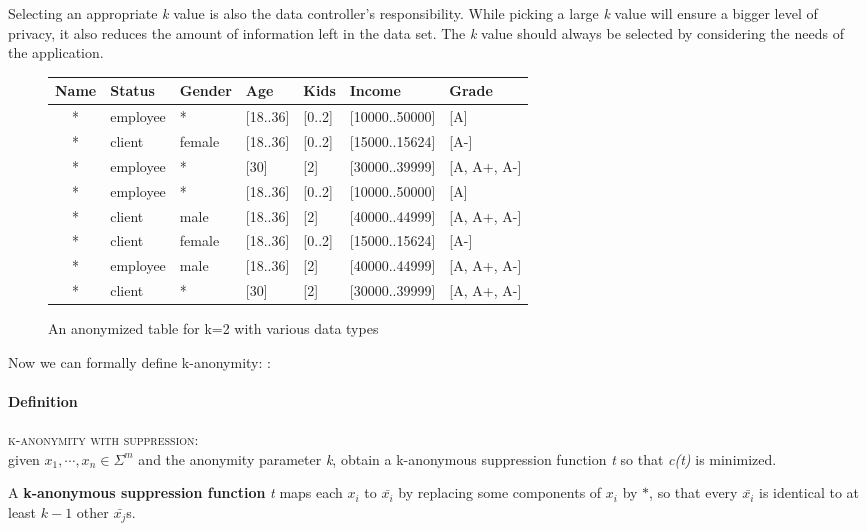 Selecting an appropriate \textit{k} value is also the data controller's responsibility. While picking a large \textit{k} value will ensure a bigger level of privacy, it also reduces the amount of information left in the data set. The \textit{k} value should always be selected by considering the needs of the application.

\begin{figure}[H]
	\centering
	\small
	\begin{tabular}{|c|l|l|l|l|l|l|}
		\hline
		\textbf{Name} & \textbf{Status} & \textbf{Gender} & \textbf{Age} & \textbf{Kids} & \textbf{Income} & \textbf{Grade} \\
		\hline
		* & employee   & *      & [18..36] & [0..2] & [10000..50000] & [A] \\
		* & client     & female & [18..36] & [0..2] & [15000..15624] & [A-] \\
	    * & employee   & *      & [30]     & [2]    & [30000..39999] & [A, A+, A-] \\
	    * & employee   & *      & [18..36] & [0..2] & [10000..50000] & [A] \\
	    * & client     & male   & [18..36] & [2]    & [40000..44999] & [A, A+, A-] \\
	    * & client     & female & [18..36] & [0..2] & [15000..15624] & [A-] \\
	    * & employee   & male   & [18..36] & [2]    & [40000..44999] & [A, A+, A-] \\
		* & client     & *      & [30]     & [2]    & [30000..39999] & [A, A+, A-] \\
		\hline
	\end{tabular}
	\caption{An anonymized table for k=2 with various data types}
	\label{k-anonymized-table}
\end{figure}

Now we can formally define k-anonymity: \cite{aggarwal}:

\paragraph{Definition} \textsc{k-anonymity with suppression}: \\
given \(x_1,\cdots,x_n \in \Sigma^m\) and the anonymity parameter \textit{k}, obtain a k-anonymous suppression function \textit{t} so that \textit{c(t)} is minimized.

A \textbf{k-anonymous suppression function} \textit{t} maps each \(x_i\) to \(\bar{x_i}\) by replacing some components of \(x_i\) by \(*\), so that every \(\bar{x_i}\) is identical to at least \(k-1\) other \(\bar{x_j}\)s.

